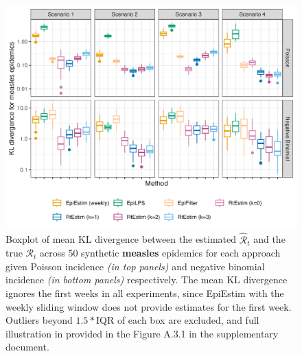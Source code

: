 \documentclass[10pt,letterpaper]{article}
\def\calR{\mathcal{R}}
\begin{document}
\begin{figure}[!ht]
  \centering
  \includegraphics[width=.99\textwidth]{fig/fig_kl_week_measles.png}
  \caption{Boxplot of mean KL divergence between the estimated 
  $\hat{\calR}_t$ and the true $\calR_t$ across 50 synthetic \textbf{measles} epidemics for 
  each approach given Poisson incidence \textit{(in top panels)} and negative 
  binomial incidence \textit{(in bottom panels)} respectively. 
  The mean KL divergence ignores the first weeks in all experiments, since EpiEstim 
  with the weekly sliding window does not provide estimates for the first week.
  Outliers beyond $1.5*$IQR of each box are excluded, and full illustration in 
  provided in the Figure A.3.1 in the supplementary document.} 
  \label{fig:kl-res-measles}
\end{figure}
\end{document}
